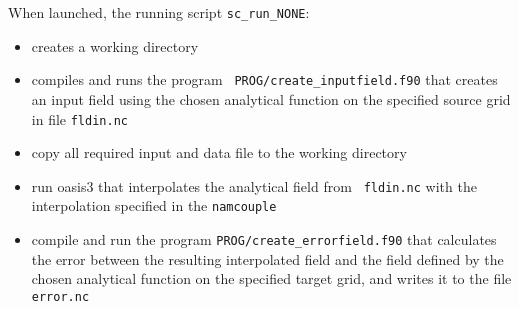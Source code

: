 When launched, the running script {\tt sc\_run\_NONE}:
\begin{itemize}
\item creates a working directory
\item compiles and runs the program {\tt
    PROG/create\_inputfield.f90} that creates an input field using the
  chosen analytical function on the specified source grid in file
  {\tt fldin.nc}
\item copy all required input and data file to the working directory 
\item run oasis3 that interpolates the analytical field from {\tt
    fldin.nc} with the interpolation specified in the {\tt namcouple}
\item compile and run the program {\tt PROG/create\_errorfield.f90}
  that calculates the error between the resulting interpolated field
  and the field defined by the chosen analytical function on the
  specified target grid, and writes it to the file {\tt error.nc}
\end{itemize}


